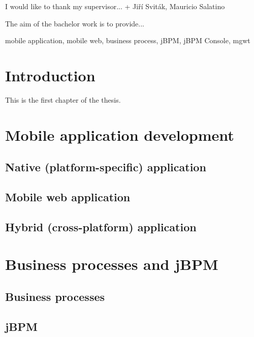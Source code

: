 \documentclass[12pt,oneside,draft]{fithesis2}
\begin{document}
\FrontMatter
\ThesisTitlePage

\begin{ThesisDeclaration}
\DeclarationText
\AdvisorName
\end{ThesisDeclaration}

\begin{ThesisThanks}
I would like to thank my supervisor... + Jiří Sviták, Mauricio Salatino
\end{ThesisThanks}

\begin{ThesisAbstract}
The aim of the bachelor work is to provide...
\end{ThesisAbstract}

\begin{ThesisKeyWords}
mobile application, mobile web, business process, jBPM, jBPM Console, mgwt
\end{ThesisKeyWords}

\tableofcontents %

\MainMatter
\chapter{Introduction}
This is the first chapter of the thesis.

\chapter{Mobile application development}
\section{Native (platform-specific) application}
\section{Mobile web application}
\section{Hybrid (cross-platform) application}

\chapter{Business processes and jBPM}
\section{Business processes}
\section{jBPM}
\end{document}
